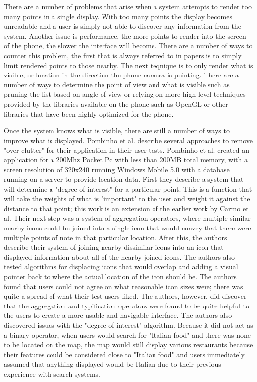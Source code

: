 \documentclass{acm_proc_article-sp}
\begin{document}
There are a number of problems that arise when a system attempts to render too many points in a single display.  With too many points the display becomes unreadable and a user is simply not able to discover any information from the system.  Another issue is performance, the more points to render into the screen of the phone, the slower the interface will become.  There are a number of ways to counter this problem, the first that is always referred to in papers is to simply limit rendered points to those nearby.  \cite{pombinholocation} \cite{FIMEMORE} The next teqnique is to only render what is visible, or location in the direction the phone camera is pointing.  There are a number of ways to determine the point of view and what is visible such as pruning the list based on angle of view or relying on more high level techniques provided by the libraries available on the phone such as OpenGL or other libraries that have been highly optimized for the phone.  

Once the system knows what is visible, there are still a number of ways to improve what is displayed.  Pombinho et al. describe several approaches to remove "over clutter" for their application in their user tests.  Pombinho et al. created an application for a 200Mhz Pocket Pc with less than 200MB total memory, with a screen resolution of 320x240 running Windows Mobile 5.0 with a database running on a server to provide location data.  First they describe a system that will determine a "degree of interest" for a particular point. This is a function that will take the weights of what is "important" to the user and weight it against the distance to that point; this work is an extension of the earlier work by Carmo et al. \cite{carmo2008movisys}  Their next step was a system of aggregation operators, where multiple similar nearby icons could be joined into a single icon that would convey that there were multiple points of note in that particular location.  After this, the authors describe their system of joining nearby dissimilar icons into an icon that displayed information about all of the nearby joined icons.  The authors also tested algorithms for displacing icons that would overlap and adding a visual pointer back to where the actual location of the icon should be.  The authors found that users could not agree on what reasonable icon sizes were; there was quite a spread of what their test users liked.  The authors, however, did discover that the aggregation and typification operators were found to be quite helpful to the users to create a more usable and navigable interface. The authors also discovered issues with the "degree of interest" algorithm.  Because it did not act as a binary operator, when users would search for "Italian food" and there was none to be located on the map, the map would still display various restaurants because their features could be considered close to "Italian food" and users immediately assumed that anything displayed would be Italian due to their previous experience with search systems.  \cite{pombinho2009evaluation}
\end{document}
